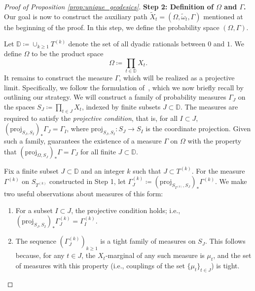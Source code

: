 \documentclass{article}
\theoremstyle{definition}
\begin{document}
\begin{proof}[Proof of Proposition \ref{prop:unique_geodesics}]
\smallskip
    \noindent \textbf{Step 2: Definition of $\Omega$ and $\Gamma$.} Our goal is now to construct the auxiliary path $\widetilde{X}_t = (\Omega, \tilde{\omega}_t, \Gamma)$ mentioned at the beginning of the proof. In this step, we define the probability space $(\Omega,\Gamma)$. 
    
    Let $\mathbb{D} \coloneqq \cup_{k \geq 1} T^{(k)}$ denote the set of all dyadic rationals between $0$ and $1$. We define  $\Omega$  to be the product space
    \[
    \Omega \coloneqq \prod_{t \in \mathbb{D}} X_t.
    \]
It remains to construct the measure $\Gamma$, which will be realized as a projective limit. Specifically, we follow the formulation of~\cite[Theorem 8.23]{kallenberg2002foundations}, which we now briefly recall by outlining our strategy. We will construct a family of probability measures $\Gamma_J$ on the spaces $S_J \coloneqq \prod_{t \in J} X_t$, indexed by finite subsets $J \subset \mathbb{D}$. The measures are  required to satisfy the \emph{projective condition}, that is, for all $I \subset J$, $(\mathrm{proj}_{S_J,S_I})_\ast \Gamma_J = \Gamma_I$, where $\mathrm{proj}_{S_J,S_I}:S_J \to S_I$ is the coordinate projection. Given such a family, \cite[Theorem 8.23]{kallenberg2002foundations} guarantees the existence of a measure $\Gamma$ on $\Omega$ with the property that $(\mathrm{proj}_{\Omega,S_J})_\ast \Gamma = \Gamma_J$ for all finite $J \subset \mathbb{D}$.

Fix a finite subset $J \subset \mathbb{D}$ and an integer $k$ such that $J \subset T^{(k)}$. For the measure $\Gamma^{(k)}$ on $S_{T^{(k)}}$ constructed in Step 1, let $\Gamma^{(k)}_J \coloneqq (\mathrm{proj}_{S_{T^{(k)}},S_J})_\ast \Gamma^{(k)}$. We make two useful observations about measures of this form:
\begin{enumerate}[label=(\arabic*)]
    \item[(Obs 1)] For a subset $I \subset J$, the projective condition holds; i.e., $(\mathrm{proj}_{S_J,S_I})_\ast \Gamma^{(k)}_J = \Gamma^{(k)}_I$.
    \item[(Obs 2)] The sequence $(\Gamma_J^{(k)})_{k \geq 1}$ is a tight family of measures on $S_J$. This follows because, for any $t \in J$, the $X_t$-marginal of any such measure is $\mu_t$, and the set of measures with this property (i.e., couplings of the set $\{\mu_t\}_{t \in J}$) is tight. 
\end{enumerate}


\end{proof}
\end{document}
